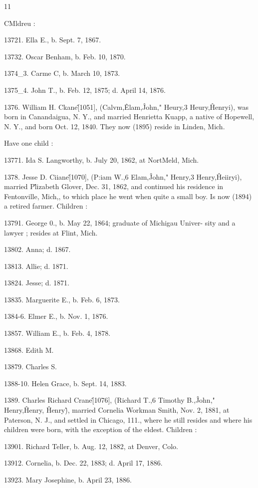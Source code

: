 \documentclass{book}
\begin{document}
11 




CMldreu : 

13721. Ella E., b. Sept. 7, 1867. 

13732. Oscar Benham, b. Feb. 10, 1870. 

1374\_3. Carme C, b. March 10, 1873. 

1375\_4. John T., b. Feb. 12, 1875; d. April 14, 1876. 

1376. William H. Ckane\^ [1051], (Calvm,\^ Elam,\^ John," 
Heury,3 Heury,\^ Henryi), was born in Canandaigua, N. Y., and 
married Henrietta Kuapp, a native of Hopewell, N. Y., and born 
Oct. 12, 1840. They now (1895) reside in Linden, Mich. 

Have one child : 

13771. Ida S. Langworthy, b. July 20, 1862, at NortMeld, Mich. 

1378. Jesse D. Ciiane\^ [1070], (P:iam W.,6 Elam,\^ John," 
Henry,3 Henry,\^ Heiiryi), married P\^lizabeth Glover, Dec. 31, 
1862, and continued his residence in Fentonville, Mich,, to which 
place he went when quite a small boy. Is now (1894) a retired 
farmer. Children : 

13791. George 0., b. May 22, 1864; graduate of Michigau Univer- 
sity and a lawyer ; resides at Flint, Mich. 

13802. Anna; d. 1867. 

13813. Allie; d. 1871. 

13824. Jesse; d. 1871. 

13835. Marguerite E., b. Feb. 6, 1873. 

1384-6. Elmer E., b. Nov. 1, 1876. 

13857. William E., b. Feb. 4, 1878. 

13868. Edith M. 

13879. Charles S. 

1388-10. Helen Grace, b. Sept. 14, 1883. 

1389. Charles Richard Crane\^ [1076], (Richard T.,6 
Timothy B.,\^ John," Henry,\^ Henry, \^ Henry\^), married Cornelia 
Workman Smith, Nov. 2, 1881, at Paterson, N. J., and settled 
in Chicago, 111., where he still resides and where his children 
were born, with the exception of the eldest. Children : 

13901. Richard Teller, b. Aug. 12, 1882, at Denver, Colo. 

13912. Cornelia, b. Dec. 22, 1883; d. April 17, 1886. 

13923. Mary Josephine, b. April 23, 1886. 
\end{document}
